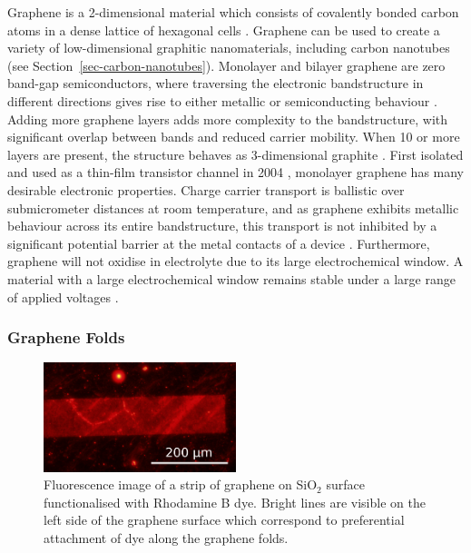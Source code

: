 \documentclass[
  a4paper,
]{scrbook}
\begin{document}
Graphene is a 2-dimensional material which consists of covalently bonded
carbon atoms in a dense lattice of hexagonal cells
\autocite{McEuen2002,Novoselov2004,Geim2007,Tran2016}. Graphene can be
used to create a variety of low-dimensional graphitic nanomaterials,
including carbon nanotubes \autocite{McEuen2002} (see
Section~\ref{sec-carbon-nanotubes}). Monolayer and bilayer graphene are
zero band-gap semiconductors, where traversing the electronic
bandstructure in different directions gives rise to either metallic or
semiconducting behaviour \autocite{McEuen2002,Peng2018}. Adding more
graphene layers adds more complexity to the bandstructure, with
significant overlap between bands and reduced carrier mobility. When 10
or more layers are present, the structure behaves as 3-dimensional
graphite \autocite{Geim2007,Ohno2015}. First isolated and used as a
thin-film transistor channel in 2004 \autocite{Novoselov2004}, monolayer
graphene has many desirable electronic properties. Charge carrier
transport is ballistic over submicrometer distances at room temperature,
and as graphene exhibits metallic behaviour across its entire
bandstructure, this transport is not inhibited by a significant
potential barrier at the metal contacts of a device
\autocite{Novoselov2004,Geim2007,Peng2018}. Furthermore, graphene will
not oxidise in electrolyte due to its large electrochemical window. A
material with a large electrochemical window remains stable under a
large range of applied voltages \autocite{Ohno2015,Tran2016}.

\hypertarget{graphene-folds}{%
\subsubsection*{Graphene Folds}\label{graphene-folds}}

\begin{figure}

{\centering \includegraphics[width=0.5\textwidth,height=\textheight]{figures/ch2/modified_NGW8D4_1mM_rhodamineB_centralchannel3_postMsurfactantclean5min_2.4sexposure_20X_221111.png}

}

\caption{\label{fig-graphene-folds}Fluorescence image of a strip of
graphene on SiO\(_2\) surface functionalised with Rhodamine B dye.
Bright lines are visible on the left side of the graphene surface which
correspond to preferential attachment of dye along the graphene folds.}

\end{figure}
\end{document}
